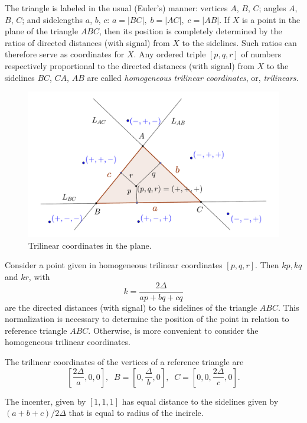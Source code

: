 The triangle is labeled in the usual (Euler's) manner: vertices $A$, $B$, $C$; angles $A$, $B$, $C$;
and sidelengths $a$, $b$, $c$: $a=|BC|,\; b =|AC|,\; c =|AB|$. If $X$ is a point in the plane of
the triangle $ABC$, then its position is completely determined by the ratios of directed distances (with signal)
from $X$ to the sidelines. Such ratios can therefore serve as coordinates for $X$.
Any ordered triple $[p, q,r]$ of numbers respectively proportional to the
directed distances (with signal) from $X$ to the sidelines $BC$, $CA$, $AB$ are called {\em  homogeneous trilinear coordinates}, or,  {\em  trilinears.}

\begin{figure}
    \centering
 \includegraphics[scale=0.5]{zappA/pics/pics-appA-020-trilinear_signal.pdf}
    \caption{Trilinear coordinates in the plane.}
    \label{fig:trilinear_signal}
\end{figure}

Consider a point given in  homogeneous trilinear coordinates $[p,q,r]$.   Then   $k p,k q$ and $k r$, with
%
\[
k=\frac{2\Delta}{a p+b q+c q}
\]
are the directed distances (with signal) to the sidelines of the triangle $ABC$. This normalization is necessary  to      determine the position of the point in relation to reference triangle $ABC$. Otherwise, is more convenient to consider the homogeneous trilinear coordinates.

The trilinear coordinates of the vertices of a reference triangle are
\[ [\frac{2\Delta}{a},0,0],\;\;B=[ 
0,\frac{
	\Delta}{b} ,0],\;\; C=[
0,0,\frac{2\Delta}{c},0].
\]

The incenter, given by $[1,1,1]$ has equal distance to the sidelines given by $(a+b+c)/2\Delta$ that is equal to radius of the incircle.